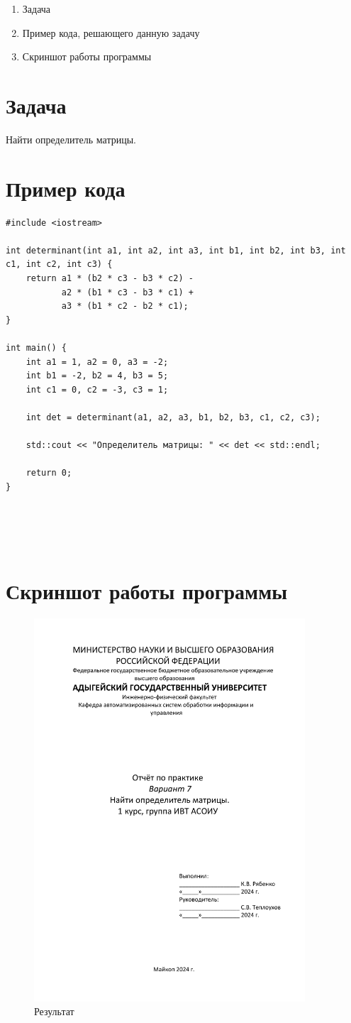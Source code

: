 \documentclass[12pt,a4paper]{scrartcl}
\begin{document}
\begin{enumerate}
	\item Задача
	\item Пример кода, решающего данную задачу
	\item Скриншот работы программы
\end{enumerate}
\section{Задача}
Найти определитель матрицы.
\section{Пример кода}
\label{sec:exp:code}
\begin{verbatim}
#include <iostream>

int determinant(int a1, int a2, int a3, int b1, int b2, int b3, int c1, int c2, int c3) {
    return a1 * (b2 * c3 - b3 * c2) -
           a2 * (b1 * c3 - b3 * c1) +
           a3 * (b1 * c2 - b2 * c1);
}

int main() {
    int a1 = 1, a2 = 0, a3 = -2;
    int b1 = -2, b2 = 4, b3 = 5;
    int c1 = 0, c2 = -3, c3 = 1;

    int det = determinant(a1, a2, a3, b1, b2, b3, c1, c2, c3);

    std::cout << "Определитель матрицы: " << det << std::endl;

    return 0;
}

	
	
	
\end{verbatim}
\vfill

\section{Скриншот работы программы}
\label{sec:picexample}
\begin{figure}[h]
	\centering
	\includegraphics[width=0.9\textwidth]{Отчёт.pdf}
	\caption{Результат}\label{fig:par}
\end{figure}
\end{document}
